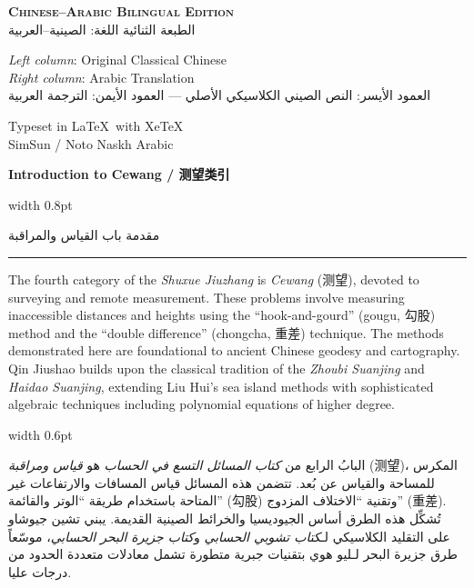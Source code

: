 \documentclass[11pt,a4paper]{article}
\newlength{\cnwidth}
\newlength{\arwidth}
\newcommand{\paralleltext}[2]{%
  \par\medskip\noindent
  \begin{minipage}[t]{\cnwidth}%
    \small #1%
  \end{minipage}%
  \hfill\textcolor{colrule}{\vrule width 0.6pt}\hfill
  \begin{minipage}[t]{\arwidth}%
    \small\arabicfont\beginR #2\endR%
  \end{minipage}%
  \par\medskip
}
\newcommand{\parallelsection}[2]{%
  \par\bigskip\noindent
  \begin{minipage}[t]{\cnwidth}%
    \Large\bfseries\color{sectioncolor} #1%
  \end{minipage}%
  \hfill\textcolor{colrule}{\vrule width 0.8pt}\hfill
  \begin{minipage}[t]{\arwidth}%
    \Large\arabicfontbf\color{sectioncolor}\beginR #2\endR%
  \end{minipage}%
  \par\medskip\noindent\textcolor{colrule}{\rule{\textwidth}{0.6pt}}\par\medskip
}
\begin{document}
\begin{titlepage}
\vspace{0.5cm}

{\normalsize\textbf{\textsc{Chinese--Arabic Bilingual Edition}}\\[0.2em]
\arabicfont\beginR الطبعة الثنائية اللغة: الصينية--العربية\endR}

\vspace{0.5cm}

{\small
\textit{Left column}: Original Classical Chinese\\
\textit{Right column}: Arabic Translation\\[0.2em]
\arabicfont\beginR العمود الأيسر: النص الصيني الكلاسيكي الأصلي --- العمود الأيمن: الترجمة العربية\endR
}

\vfill

{\small Typeset in \LaTeX\ with XeTeX\\
SimSun / Noto Naskh Arabic}

\end{titlepage}

\newpage
\tableofcontents
\newpage

\parallelsection{Introduction to Cewang / 测望类引}{مقدمة باب القياس والمراقبة}

\paralleltext{%
The fourth category of the \textit{Shuxue Jiuzhang} is \textit{Cewang} (测望), devoted to surveying and remote measurement. These problems involve measuring inaccessible distances and heights using the ``hook-and-gourd'' (gougu, 勾股) method and the ``double difference'' (chongcha, 重差) technique. The methods demonstrated here are foundational to ancient Chinese geodesy and cartography. Qin Jiushao builds upon the classical tradition of the \textit{Zhoubi Suanjing} and \textit{Haidao Suanjing}, extending Liu Hui's sea island methods with sophisticated algebraic techniques including polynomial equations of higher degree.
}{%
البابُ الرابع من \textit{كتاب المسائل التسع في الحساب} هو \textit{قياس ومراقبة} (测望)، المكرس للمساحة والقياس عن بُعد. تتضمن هذه المسائل قياس المسافات والارتفاعات غير المتاحة باستخدام طريقة ``الوتر والقائمة'' (勾股) وتقنية ``الاختلاف المزدوج'' (重差). تُشكِّل هذه الطرق أساس الجيوديسيا والخرائط الصينية القديمة. يبني تشين جيوشاو على التقليد الكلاسيكي لـ\textit{كتاب تشوبي الحسابي} و\textit{كتاب جزيرة البحر الحسابي}، موسّعاً طرق جزيرة البحر لـليو هوي بتقنيات جبرية متطورة تشمل معادلات متعددة الحدود من درجات عليا.
}
\end{document}
